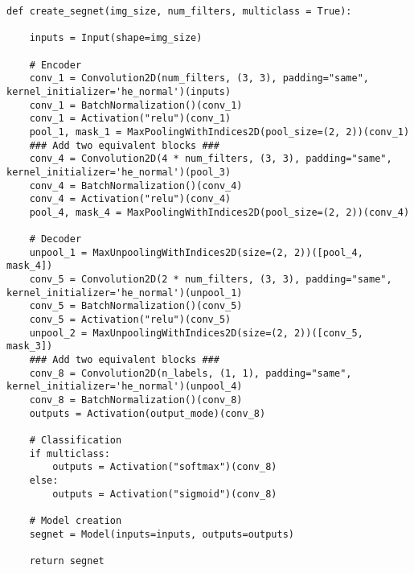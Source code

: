 \newpage
\begin{lstlisting}[caption={Simplified SegNet}, label={lst:segnet}, captionpos=b]
def create_segnet(img_size, num_filters, multiclass = True):

    inputs = Input(shape=img_size)
    
    # Encoder
    conv_1 = Convolution2D(num_filters, (3, 3), padding="same",                               kernel_initializer='he_normal')(inputs)
    conv_1 = BatchNormalization()(conv_1)
    conv_1 = Activation("relu")(conv_1)
    pool_1, mask_1 = MaxPoolingWithIndices2D(pool_size=(2, 2))(conv_1)
    ### Add two equivalent blocks ###
    conv_4 = Convolution2D(4 * num_filters, (3, 3), padding="same", kernel_initializer='he_normal')(pool_3)
    conv_4 = BatchNormalization()(conv_4)
    conv_4 = Activation("relu")(conv_4)
    pool_4, mask_4 = MaxPoolingWithIndices2D(pool_size=(2, 2))(conv_4)

    # Decoder
    unpool_1 = MaxUnpoolingWithIndices2D(size=(2, 2))([pool_4, mask_4])
    conv_5 = Convolution2D(2 * num_filters, (3, 3), padding="same", kernel_initializer='he_normal')(unpool_1)
    conv_5 = BatchNormalization()(conv_5)
    conv_5 = Activation("relu")(conv_5)
    unpool_2 = MaxUnpoolingWithIndices2D(size=(2, 2))([conv_5, mask_3])
    ### Add two equivalent blocks ###
    conv_8 = Convolution2D(n_labels, (1, 1), padding="same", kernel_initializer='he_normal')(unpool_4)
    conv_8 = BatchNormalization()(conv_8)
    outputs = Activation(output_mode)(conv_8)   
    
    # Classification
    if multiclass:
        outputs = Activation("softmax")(conv_8)
    else:
        outputs = Activation("sigmoid")(conv_8)
    
    # Model creation
    segnet = Model(inputs=inputs, outputs=outputs)
    
    return segnet
\end{lstlisting}
\newpage
